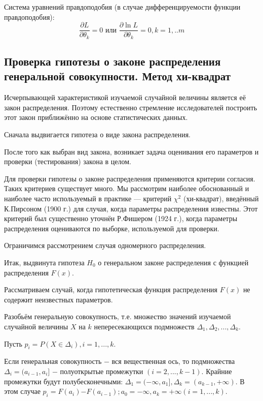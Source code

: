 \documentclass[a4paper]{article}
\begin{document}
Система уравнений правдоподобия (в случае дифференцируемости функции правдоподобия):
$$
\frac{\partial L}{\partial \theta_{k}} = 0 \text{  или  } \frac{\partial \ln L}{\partial \theta_{k}} = 0, k = 1,..m
$$

\subsection{Проверка гипотезы о законе распределения генеральной совокупности. Метод хи-квадрат}
\noindent Исчерпывающей характеристикой изучаемой случайной величины является её закон распределения. Поэтому естественно стремление исследователей построить этот закон приближённо на основе статистических данных.

Сначала выдвигается гипотеза о виде закона распределения.

После того как выбран вид закона, возникает задача оценивания его параметров и проверки (тестирования) закона в целом.

Для проверки гипотезы о законе распределения применяются критерии согласия. Таких критериев существует много. Мы рассмотрим наиболее обоснованный и наиболее часто используемый в практике — критерий $\chi^{2}$ (хи-квадрат), введённый К.Пирсоном (1900 г.) для случая, когда параметры распределения известны. Этот критерий был существенно уточнён Р.Фишером (1924 г.), когда параметры распределения оцениваются по выборке, используемой для проверки.

Ограничимся рассмотрением случая одномерного распределения.

Итак, выдвинута гипотеза $H_{0}$ о генеральном законе распределения с функцией распределения $F(x)$.

Рассматриваем случай, когда гипотетическая функция распределения $F(x)$ не содержит неизвестных параметров.

Разобьём генеральную совокупность, т.е. множество значений изучаемой случайной величины $X$ на $k$ непересекающихся подмножеств $\Delta_{1},\Delta_{2}, ... ,\Delta_{k}$.

Пусть $p_{i} = P(X \in \Delta_{i}), i = 1, ... ,k$. 

Если генеральная совокупность $-$ вся вещественная ось, то подмножества $\Delta_i = (a_{i-1},a_{i}]$ $-$ полуоткрытые промежутки $(i = 2, ... ,k-1)$. Крайние промежутки будут полубесконечными: $\Delta_{1} = (-\infty,a_{1}], \Delta_{k} = (a_{k-1},+\infty).$ В этом случае $p_{i} = F(a_{i})$$-$$F(a_{i-1}); a_{0} = -\infty, a_{k} = +\infty (i = 1, ... ,k).$
\end{document}
